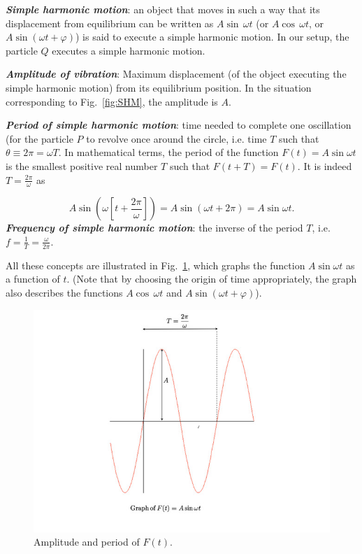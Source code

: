 \documentclass[12pt]{article}
\numberwithin{equation}{section}
\begin{document}
{\bf {\em Simple harmonic motion}}: an object that moves in such a way that its displacement from equilibrium can be written as $A\sin \,\omega t$ (or $A\cos\,\omega t$, or $A\sin (\omega t+\varphi)$) is said to execute a simple harmonic motion. In our setup, the particle $Q$ executes a simple harmonic motion.

{\bf {\em Amplitude of vibration}}: Maximum displacement (of the object executing the simple harmonic motion) from its equilibrium position. In the situation corresponding to Fig.~\ref{fig:SHM}, the amplitude is $A$.

{\bf {\em Period of simple harmonic motion}}: time needed to complete one oscillation (for the particle $P$ to revolve once around the circle, i.e. time $T$ such that $\theta\equiv 2\pi=\omega T$. In mathematical terms, the period of the function $F(t)=A\sin \omega t$ is the smallest positive real number $T$ such that $F(t+T)=F(t)$. It is indeed $T=\frac{2\pi}{\omega}$ as 

\[
A\sin(\omega[t +\frac{2\pi}{\omega}])=A\sin (\omega t +2\pi)=A\sin \omega t.
\]
{\bf {\em Frequency of simple harmonic motion}}: the inverse of the period $T$, i.e. \break $f=\frac{1}{T}=\frac{\omega}{2\pi}$.


All these concepts are illustrated in Fig.~\ref{fig:sinusoid}, which graphs the function
$A\sin \omega t$ as a function of $t$. (Note that by choosing the origin of time appropriately, the graph also describes the functions $A\cos\,\omega t$ and $A\sin (\omega t+\varphi)$).
\begin{figure}[ht]
\begin{center}
\includegraphics[width=12.7cm,keepaspectratio]{Figs/sinusoid.jpg}
\end{center}
\caption{\small Amplitude and period of $F(t)$.}
\label{fig:sinusoid}
\end{figure}
\end{document}
